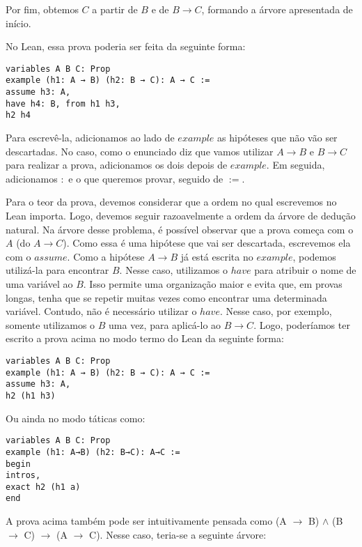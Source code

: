 Por fim, obtemos $C$ a partir de $B$ e de $B \rightarrow C$, formando a árvore apresentada de início. 

No Lean, essa prova poderia ser feita da seguinte forma: 
\begin{lstlisting}
variables A B C: Prop
example (h1: A → B) (h2: B → C): A → C :=
assume h3: A,
have h4: B, from h1 h3,
h2 h4
\end{lstlisting}


Para escrevê-la, adicionamos ao lado de $example$ as hipóteses que não vão ser descartadas. No caso, como o enunciado diz que vamos utilizar $A\rightarrow B$ e $B\rightarrow C$ para realizar a prova, adicionamos os dois depois de $example$. Em seguida, adicionamos $:$ e o que queremos provar, seguido de $:=$. 

Para o teor da prova, devemos considerar que a ordem no qual escrevemos no Lean importa. Logo, devemos seguir razoavelmente a ordem da árvore de dedução natural. Na árvore desse problema, é possível observar que a prova começa com o $A$ (do $A \rightarrow C$). Como essa é uma hipótese que vai ser descartada, escrevemos ela com o $assume$. Como a hipótese $A \rightarrow B$ já está escrita no $example$, podemos utilizá-la para encontrar $B$. Nesse caso, utilizamos o $have$ para atribuir o nome de uma variável ao $B$. Isso permite uma organização maior e evita que, em provas longas, tenha que se repetir muitas vezes como encontrar uma determinada variável. Contudo, não é necessário utilizar o $have$. Nesse caso, por exemplo, somente utilizamos o $B$ uma vez, para aplicá-lo ao $B \rightarrow C$. Logo, poderíamos ter escrito a prova acima no modo termo do Lean da seguinte forma:

\begin{lstlisting}
variables A B C: Prop
example (h1: A → B) (h2: B → C): A → C :=
assume h3: A,
h2 (h1 h3)
\end{lstlisting}

Ou ainda no modo táticas como:

\begin{lstlisting}
variables A B C: Prop
example (h1: A→B) (h2: B→C): A→C :=
begin
intros,
exact h2 (h1 a)  
end
\end{lstlisting}

A prova acima também pode ser intuitivamente pensada como (A $\rightarrow$ B) $\land$ (B $\rightarrow$ C) $\rightarrow$ (A $\rightarrow$ C). Nesse caso, teria-se a seguinte árvore:

